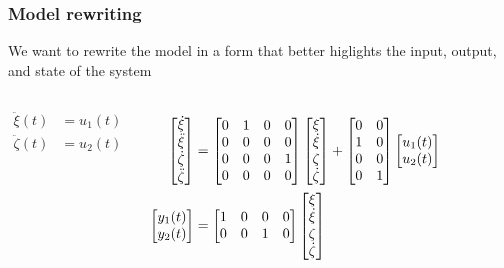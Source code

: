 \begin{frame} 
	\frametitle{Model rewriting}
	We want to rewrite the model in a form that better higlights the input, output, and state of the system
    \begin{columns}[onlytextwidth]
        \begin{align*}
        \ddot{\xi}(t)& = u_1(t) \\
        \ddot{\zeta}(t)& = u_2(t)
        \end{align*}
    	\begin{align*}
    	  \begin{bmatrix}\dot{\xi}\\\ddot{\xi}\\\dot{\zeta}\\\ddot{\zeta}\end{bmatrix}&=
          \begin{bmatrix}0&1&0&0\\0&0&0&0\\0&0&0&1\\0&0&0&0\end{bmatrix}\begin{bmatrix}\xi\\\dot{\xi}\\{\zeta}\\\dot{\zeta}\end{bmatrix} + \begin{bmatrix}0&0\\1  &0\\0&0 \\0&1\end{bmatrix} \begin{bmatrix}u_1(t)\\u_2(t)\end{bmatrix}\\
          \begin{bmatrix}y_1(t)\\y_2(t)\end{bmatrix}&=\begin{bmatrix}1&0&0&0\\0&0&1&0\end{bmatrix}\begin{bmatrix}\xi\\\dot{\xi}\\{\zeta}\\\dot{\zeta}\end{bmatrix}
    	\end{align*}
    \end{columns}
\end{frame}

